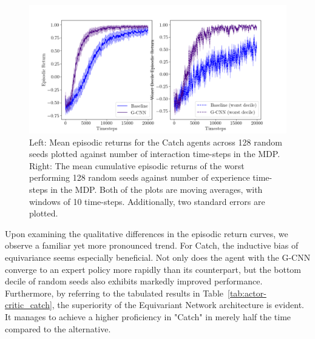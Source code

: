 \begin{figure}
	\centering
	\includegraphics[width=\linewidth]{Figures/catch_returns.png}
	\caption{Left: Mean episodic returns for the Catch agents across 128 random seeds plotted against number of interaction time-steps in the MDP. Right: The mean cumulative episodic returns of the worst performing 128 random seeds against number of experience time-steps in the MDP. Both of the plots are moving averages, with windows of 10 time-steps. Additionally, two standard errors are plotted.}
\end{figure}
Upon examining the qualitative differences in the episodic return curves, we observe a familiar yet more pronounced trend. For Catch, the inductive bias of equivariance seems especially beneficial. Not only does the agent with the G-CNN converge to an expert policy more rapidly than its counterpart, but the bottom decile of random seeds also exhibits markedly improved performance. Furthermore, by referring to the tabulated results in Table~\ref{tab:actor-critic_catch}, the superiority of the Equivariant Network architecture is evident. It manages to achieve a higher proficiency in "Catch" in merely half the time compared to the alternative.

